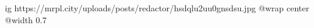  
 
 
 
 

\ifcmt
  ig https://mrpl.city/uploads/posts/redactor/hsdqlu2uu0gnsdsu.jpg
  @wrap center
  @width 0.7
\fi
